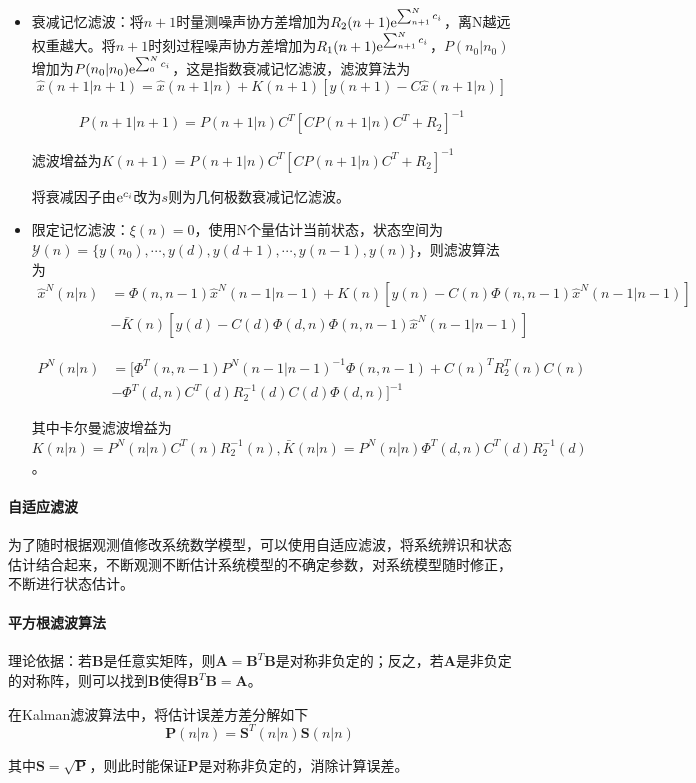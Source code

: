 \documentclass[11pt,a4paper]{ctexart}
\newcommand{\e}{{\rm e}}
\begin{document}
            \begin{itemize}
                \item 衰减记忆滤波：将$n+1$时量测噪声协方差增加为$R_2(n+1)\e^{\sum_{n+1}^Nc_i}$，离N越远权重越大。将$n+1$时刻过程噪声协方差增加为$R_1(n+1)\e^{\sum_{n+1}^Nc_i}$，$P(n_0|n_0)$增加为$P(n_0|n_0)\e^{\sum_{0}^Nc_i}$，这是指数衰减记忆滤波，滤波算法为
                \[
                \hat x(n+1|n+1)=\hat x(n+1|n)+K(n+1)[y(n+1)-C\hat x(n+1|n)]
                \]

                \[
                P(n+1|n+1)=P(n+1|n)C^T[CP(n+1|n)C^T+R_2]^{-1}
                \]

                滤波增益为$K(n+1)=P(n+1|n)C^T[CP(n+1|n)C^T+R_2]^{-1}$

                将衰减因子由$\e^{c_i}$改为$s$则为几何极数衰减记忆滤波。
                \item 限定记忆滤波：$\xi(n)=0$，使用N个量估计当前状态，状态空间为$\mathscr{Y}(n)=\{y(n_0),\cdots,y(d),y(d+1),\cdots,y(n-1),y(n)\}$，则滤波算法为
                \begin{align*}
                \hat x^N(n|n)&=\varPhi(n,n-1)\hat x^N(n-1|n-1)+K(n)[y(n)-C(n)\varPhi(n,n-1)\hat x^N(n-1|n-1)]\\
                &-\bar K(n)[y(d)-C(d)\varPhi(d,n)\varPhi(n,n-1)\hat x^N(n-1|n-1)]    
                \end{align*}

                \begin{align*}
                P^N(n|n)&=[\varPhi^T(n,n-1)P^N(n-1|n-1)^{-1}\varPhi(n,n-1)+C(n)^TR_2^T(n)C(n)\\
                &-\varPhi^T(d,n)C^T(d)R_2^{-1}(d)C(d)\varPhi(d,n)]^{-1}
                \end{align*}

                其中卡尔曼滤波增益为$K(n|n)=P^N(n|n)C^T(n)R_2^{-1}(n),\bar K(n|n)=P^N(n|n)\varPhi^T(d,n)C^T(d)R_2^{-1}(d)$。
            \end{itemize}
            

            
            \paragraph{自适应滤波}\leavevmode

            为了随时根据观测值修改系统数学模型，可以使用自适应滤波，将系统辨识和状态估计结合起来，不断观测不断估计系统模型的不确定参数，对系统模型随时修正，不断进行状态估计。

            \paragraph{平方根滤波算法}\leavevmode

            理论依据：若$\bm B$是任意实矩阵，则$\bm A=\bm B^T\bm B$是对称非负定的；反之，若$\bm A$是非负定的对称阵，则可以找到$\bm B$使得$\bm B^T\bm B=\bm A$。
            
            在Kalman滤波算法中，将估计误差方差分解如下
            \[
            \bm P(n|n)=\bm S^T(n|n)\bm S(n|n)
            \]

            其中$\bm S=\sqrt{\bm P}$，则此时能保证$\bm P$是对称非负定的，消除计算误差。
\end{document}
